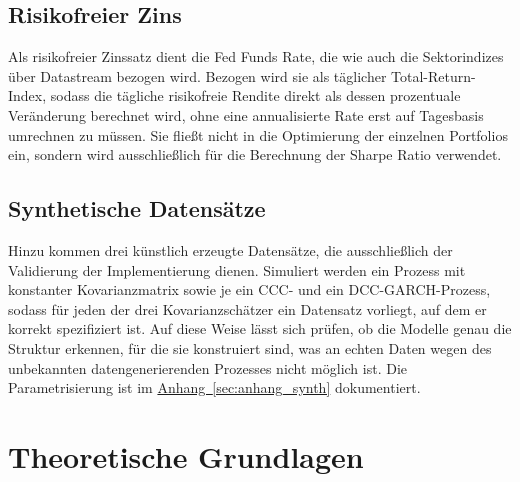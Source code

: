 \documentclass[a4paper, 12pt]{article}
\begin{document}
\subsection{Risikofreier Zins}\label{sec:risikofrei}
Als risikofreier Zinssatz dient die Fed Funds Rate, die wie auch die Sektorindizes über Datastream bezogen wird.
Bezogen wird sie als täglicher Total-Return-Index, sodass die tägliche risikofreie Rendite direkt als dessen prozentuale Veränderung berechnet wird, ohne eine annualisierte Rate erst auf Tagesbasis umrechnen zu müssen.
Sie fließt nicht in die Optimierung der einzelnen Portfolios ein, sondern wird ausschließlich für die Berechnung der Sharpe Ratio verwendet.

\subsection{Synthetische Datensätze}\label{sec:synthdaten}
Hinzu kommen drei künstlich erzeugte Datensätze, die ausschließlich der Validierung der Implementierung dienen.
Simuliert werden ein Prozess mit konstanter Kovarianzmatrix sowie je ein CCC- und ein DCC-GARCH-Prozess, sodass für jeden der drei Kovarianzschätzer ein Datensatz vorliegt, auf dem er korrekt spezifiziert ist.
Auf diese Weise lässt sich prüfen, ob die Modelle genau die Struktur erkennen, für die sie konstruiert sind, was an echten Daten wegen des unbekannten datengenerierenden Prozesses nicht möglich ist.
Die Parametrisierung ist im \hyperref[sec:anhang_synth]{Anhang~\ref*{sec:anhang_synth}} dokumentiert.

\section{Theoretische Grundlagen}\label{sec:theorie}
\end{document}
